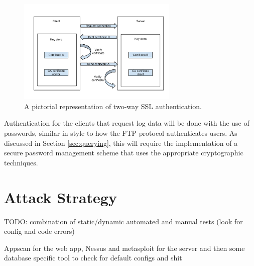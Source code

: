 \documentclass{sig-alternate}
\begin{document}
\begin{figure}[ht!]
\begin{center}
\includegraphics[width=3in]{images/two_way_ssl.pdf}
\caption{A pictorial representation of two-way SSL authentication. }
\label{fig:ssl}
\end{center}
\end{figure}

Authentication for the clients that request log data will be done with the use of passwords, similar in style to how the 
FTP protocol authenticates users. As discussed in Section \ref{sec:querying}, this will require the implementation of 
a secure password management scheme that uses the appropriate cryptographic techniques. 


\section{Attack Strategy}
\label{sec:attack}

TODO: combination of static/dynamic automated and manual tests (look for config and code errors)

Appscan for the web app, Nessus and metasploit for the server and then some database specific tool to check for default configs and shit

\balance
\end{document}
